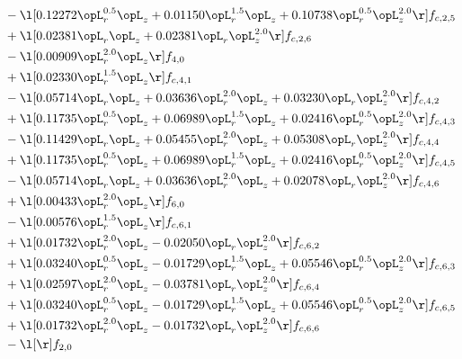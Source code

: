 \begin{alignat}{2}
& - \l[  0.12272 \opL_r^{0.5} \opL_z +  0.01150 \opL_r^{1.5} \opL_z +  0.10738 \opL_r^{0.5} \opL_z^{2.0}  \r] f_{c,2,5} \nonumber \\ 
& + \l[  0.02381 \opL_r \opL_z +  0.02381 \opL_r \opL_z^{2.0}  \r] f_{c,2,6} \nonumber \\ 
& - \l[  0.00909 \opL_r^{2.0} \opL_z  \r] f_{4,0} \nonumber \\ 
& + \l[  0.02330 \opL_r^{1.5} \opL_z  \r] f_{c,4,1} \nonumber \\ 
& - \l[  0.05714 \opL_r \opL_z +  0.03636 \opL_r^{2.0} \opL_z +  0.03230 \opL_r \opL_z^{2.0}  \r] f_{c,4,2} \nonumber \\ 
& + \l[  0.11735 \opL_r^{0.5} \opL_z +  0.06989 \opL_r^{1.5} \opL_z +  0.02416 \opL_r^{0.5} \opL_z^{2.0}  \r] f_{c,4,3} \nonumber \\ 
& - \l[  0.11429 \opL_r \opL_z +  0.05455 \opL_r^{2.0} \opL_z +  0.05308 \opL_r \opL_z^{2.0}  \r] f_{c,4,4} \nonumber \\ 
& + \l[  0.11735 \opL_r^{0.5} \opL_z +  0.06989 \opL_r^{1.5} \opL_z +  0.02416 \opL_r^{0.5} \opL_z^{2.0}  \r] f_{c,4,5} \nonumber \\ 
& - \l[  0.05714 \opL_r \opL_z +  0.03636 \opL_r^{2.0} \opL_z +  0.02078 \opL_r \opL_z^{2.0}  \r] f_{c,4,6} \nonumber \\ 
& + \l[  0.00433 \opL_r^{2.0} \opL_z  \r] f_{6,0} \nonumber \\ 
& - \l[  0.00576 \opL_r^{1.5} \opL_z  \r] f_{c,6,1} \nonumber \\ 
& + \l[  0.01732 \opL_r^{2.0} \opL_z   -0.02050 \opL_r \opL_z^{2.0}  \r] f_{c,6,2} \nonumber \\ 
& + \l[  0.03240 \opL_r^{0.5} \opL_z   -0.01729 \opL_r^{1.5} \opL_z +  0.05546 \opL_r^{0.5} \opL_z^{2.0}  \r] f_{c,6,3} \nonumber \\ 
& + \l[  0.02597 \opL_r^{2.0} \opL_z   -0.03781 \opL_r \opL_z^{2.0}  \r] f_{c,6,4} \nonumber \\ 
& + \l[  0.03240 \opL_r^{0.5} \opL_z   -0.01729 \opL_r^{1.5} \opL_z +  0.05546 \opL_r^{0.5} \opL_z^{2.0}  \r] f_{c,6,5} \nonumber \\ 
& + \l[  0.01732 \opL_r^{2.0} \opL_z   -0.01732 \opL_r \opL_z^{2.0}  \r] f_{c,6,6} \nonumber \\ 
& - \l[  \r] f_{2,0} \nonumber \\ 
\end{alignat} 


